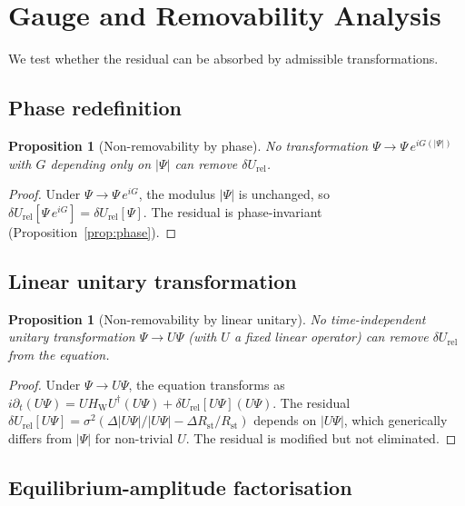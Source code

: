 \documentclass[12pt]{article}
\newtheorem{proposition}[theorem]{Proposition}
\newcommand{\HW}{H_{\mathrm{W}}}
\newcommand{\Rst}{R_{\mathrm{st}}}
\newcommand{\dUrel}{\delta U_{\mathrm{rel}}}
\begin{document}
\section{Gauge and Removability Analysis}\label{sec:gauge}

We test whether the residual can be absorbed by admissible transformations.

\subsection{Phase redefinition}

\begin{proposition}[Non-removability by phase]\label{prop:phase_gauge}
No transformation $\Psi \to \Psi\,e^{iG(|\Psi|)}$ with $G$ depending only on $|\Psi|$ can remove $\dUrel$.
\end{proposition}

\begin{proof}
Under $\Psi \to \Psi\,e^{iG}$, the modulus $|\Psi|$ is unchanged, so $\dUrel[\Psi\,e^{iG}] = \dUrel[\Psi]$. The residual is phase-invariant (Proposition~\ref{prop:phase}).
\end{proof}

\subsection{Linear unitary transformation}

\begin{proposition}[Non-removability by linear unitary]\label{prop:unitary_gauge}
No time-independent unitary transformation $\Psi \to U\Psi$ (with $U$ a fixed linear operator) can remove $\dUrel$ from the equation.
\end{proposition}

\begin{proof}
Under $\Psi \to U\Psi$, the equation transforms as $i\partial_t(U\Psi) = U\HW U^\dagger(U\Psi) + \dUrel[U\Psi](U\Psi)$. The residual $\dUrel[U\Psi] = \sigma^2(\Delta|U\Psi|/|U\Psi| - \Delta\Rst/\Rst)$ depends on $|U\Psi|$, which generically differs from $|\Psi|$ for non-trivial $U$. The residual is modified but not eliminated.
\end{proof}

\subsection{Equilibrium-amplitude factorisation}
\end{document}
